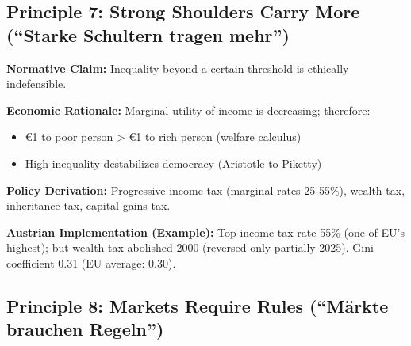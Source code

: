 
\subsection{Principle 7: Strong Shoulders Carry More (``Starke Schultern tragen mehr'')}

\begin{tcolorbox}[colback=gray!5!white, colframe=gray!75!black,
    title=Principle GEN-7: Progressive Redistribution]

\textbf{Normative Claim:} Inequality beyond a certain threshold is ethically indefensible.

\textbf{Economic Rationale:} Marginal utility of income is decreasing; therefore:
\begin{itemize}[nosep]
\item €1 to poor person > €1 to rich person (welfare calculus)
\item High inequality destabilizes democracy (Aristotle to Piketty)
\end{itemize}

\textbf{Policy Derivation:} Progressive income tax (marginal rates 25-55\%), wealth tax, inheritance tax, capital gains tax.

\textbf{Austrian Implementation (Example):} Top income tax rate 55\% (one of EU's highest); but wealth tax abolished 2000 (reversed only partially 2025). Gini coefficient 0.31 (EU average: 0.30).

\end{tcolorbox}


\subsection{Principle 8: Markets Require Rules (``Märkte brauchen Regeln'')}

